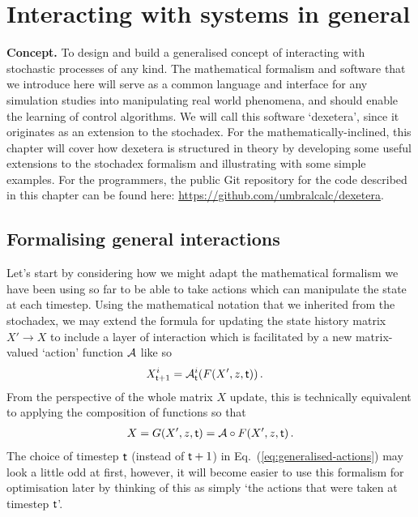 \chapter{\sffamily Interacting with systems in general}

{\bfseries\sffamily Concept.} To design and build a generalised concept of interacting with stochastic processes of any kind. The mathematical formalism and software that we introduce here will serve as a common language and interface for any simulation studies into manipulating real world phenomena, and should enable the learning of control algorithms. We will call this software `dexetera', since it originates as an extension to the stochadex. For the mathematically-inclined, this chapter will cover how dexetera is structured in theory by developing some useful extensions to the stochadex formalism and illustrating with some simple examples. For the programmers, the public Git repository for the code described in this chapter can be found here: \href{https://github.com/umbralcalc/dexetera}{https://github.com/umbralcalc/dexetera}.

\section{\sffamily Formalising general interactions}

Let's start by considering how we might adapt the mathematical formalism we have been using so far to be able to take actions which can manipulate the state at each timestep. Using the mathematical notation that we inherited from the stochadex, we may extend the formula for updating the state history matrix $X'\rightarrow X$ to include a layer of interaction which is facilitated by a new matrix-valued `action' function ${\cal A}$ like so
\begin{align}
X_{{\sf t}+1}^i &= {\cal A}^i_{{\sf t}}(F(X', z, {\sf t})) \label{eq:generalised-actions} \,.
\end{align}
From the perspective of the whole matrix $X$ update, this is technically equivalent to applying the composition of functions so that
\begin{align}
X = G(X', z, {\sf t})={\cal A}\circ F(X', z, {\sf t}) \,.
\end{align}
The choice of timestep ${\sf t}$ (instead of ${\sf t}+1$) in Eq.~(\ref{eq:generalised-actions}) may look a little odd at first, however, it will become easier to use this formalism for optimisation later by thinking of this as simply `the actions that were taken at timestep ${\sf t}$'.